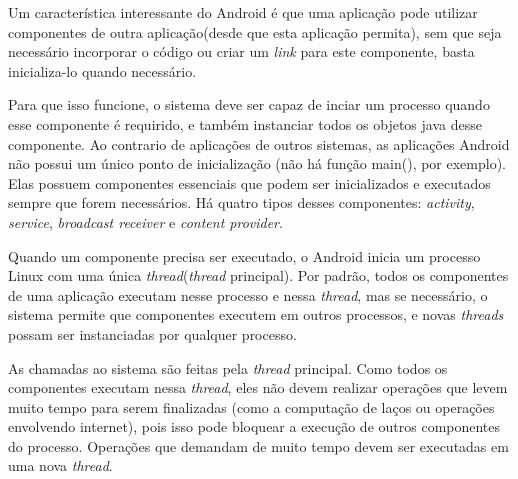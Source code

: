   Um característica interessante do Android é que uma aplicação pode utilizar
  componentes de outra aplicação(desde que esta aplicação permita), sem que seja necessário incorporar
  o código ou criar um \textit{link} para este componente, basta inicializa-lo quando necessário. 

  Para que isso funcione, o sistema deve ser capaz de inciar um processo quando 
  esse componente é requirido, e também instanciar todos os objetos java desse componente.
  Ao contrario de aplicações de outros sistemas, as aplicações Android não possui um único 
  ponto de inicialização (não há função main(), por exemplo). Elas possuem componentes essenciais 
  que podem ser inicializados e executados sempre que forem necessários. Há quatro tipos desses componentes:
  \textit{activity}, \textit{service}, \textit{broadcast receiver} e \textit{content provider}.
  
  Quando um componente precisa ser executado, o Android inicia um processo Linux com uma 
  única \textit{thread}(\textit{thread} principal). 
  Por padrão, todos os componentes de uma aplicação executam nesse processo 
  e nessa \textit{thread}, mas se necessário, 
  o sistema permite que componentes executem em outros processos, 
  e novas \textit{threads} possam ser instanciadas por qualquer processo. 
  
  As chamadas ao sistema são feitas pela \textit{thread} principal. 
  Como todos os componentes executam nessa \textit{thread}, 
  eles não devem realizar operações que levem muito tempo 
  para serem finalizadas (como a computação de laços ou operações envolvendo 
  internet), pois isso pode bloquear a execução de outros componentes do processo. 
  Operações que demandam de muito tempo devem ser 
  executadas em uma nova \textit{thread}.
  
